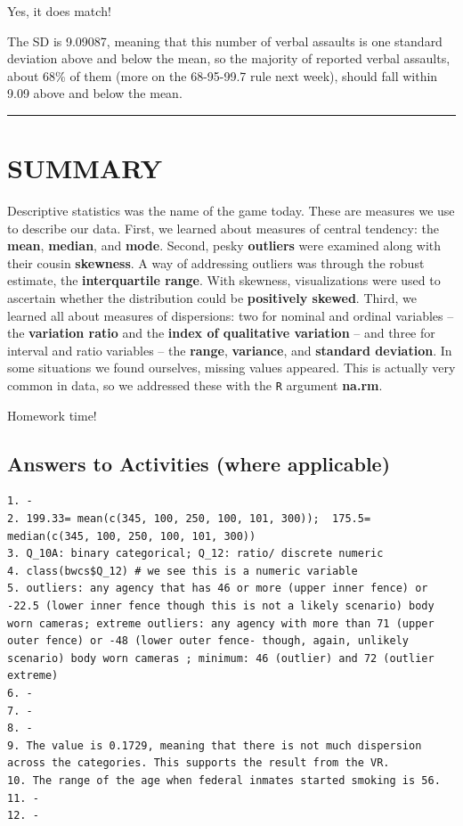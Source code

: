 \documentclass[
]{book}
\begin{document}
Yes, it does match!

The SD is 9.09087, meaning that this number of verbal assaults is one standard deviation above and below the mean, so the majority of reported verbal assaults, about 68\% of them (more on the 68-95-99.7 rule next week), should fall within 9.09 above and below the mean.

\begin{center}\rule{0.5\linewidth}{0.5pt}\end{center}

\hypertarget{summary-3}{%
\section{SUMMARY}\label{summary-3}}

Descriptive statistics was the name of the game today. These are measures we use to describe our data. First, we learned about measures of central tendency: the \textbf{mean}, \textbf{median}, and \textbf{mode}. Second, pesky \textbf{outliers} were examined along with their cousin \textbf{skewness}. A way of addressing outliers was through the robust estimate, the \textbf{interquartile range}. With skewness, visualizations were used to ascertain whether the distribution could be \textbf{positively skewed}. Third, we learned all about measures of dispersions: two for nominal and ordinal variables -- the \textbf{variation ratio} and the \textbf{index of qualitative variation} -- and three for interval and ratio variables -- the \textbf{range}, \textbf{variance}, and \textbf{standard deviation}. In some situations we found ourselves, missing values appeared. This is actually very common in data, so we addressed these with the \texttt{R} argument \textbf{na.rm}.

Homework time!

\hypertarget{answers-to-activities-where-applicable}{%
\subsection{Answers to Activities (where applicable)}\label{answers-to-activities-where-applicable}}

\begin{verbatim}
1. -
2. 199.33= mean(c(345, 100, 250, 100, 101, 300));  175.5= median(c(345, 100, 250, 100, 101, 300))
3. Q_10A: binary categorical; Q_12: ratio/ discrete numeric 
4. class(bwcs$Q_12) # we see this is a numeric variable
5. outliers: any agency that has 46 or more (upper inner fence) or -22.5 (lower inner fence though this is not a likely scenario) body worn cameras; extreme outliers: any agency with more than 71 (upper outer fence) or -48 (lower outer fence- though, again, unlikely scenario) body worn cameras ; minimum: 46 (outlier) and 72 (outlier extreme)
6. -
7. -
8. -
9. The value is 0.1729, meaning that there is not much dispersion across the categories. This supports the result from the VR.
10. The range of the age when federal inmates started smoking is 56.
11. -
12. -
\end{verbatim}
\end{document}
